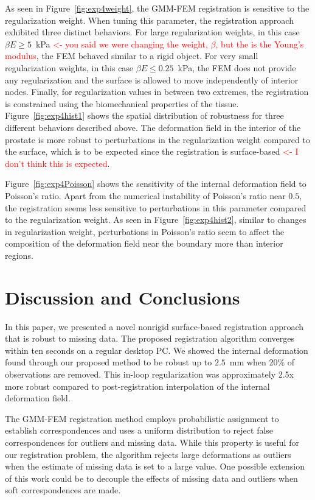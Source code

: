 \documentclass[journal]{IEEEtran}
\newcommand{\comment}[1]{\textcolor{red}{#1}}
\begin{document}
As seen in Figure~\ref{fig:exp4weight}, the GMM-FEM registration is sensitive to the regularization weight. When tuning this parameter, the registration approach exhibited three distinct behaviors. For large regularization weights, in this case $\beta{E}\geq5$~kPa \comment{<- you said we were changing the weight, $\beta$, but the is the Young's modulus}, the FEM behaved similar to a rigid object. For very small regularization weights, in this case $\beta{E}\leq0.25$~kPa, the FEM does not provide any regularization and the surface is allowed to move independently of interior nodes. Finally, for regularization values in between two extremes, the registration is constrained using the biomechanical properties of the tissue. Figure~\ref{fig:exp4hist1} shows the spatial distribution of robustness for three different behaviors described above. The deformation field in the interior of the prostate is more robust to perturbations in the regularization weight compared to the surface, which is to be expected since the registration is surface-based \comment{<- I don't think this is expected}.

Figure~\ref{fig:exp4Poisson} shows the sensitivity of the internal deformation field to Poisson's ratio. Apart from the numerical instability of Poisson's ratio near $0.5$, the registration seems less sensitive to perturbations in this parameter compared to the regularization weight. As seen in Figure~\ref{fig:exp4hist2}, similar to changes in regularization weight, perturbations in Poisson's ratio seem to affect the composition of the deformation field near the boundary more than interior regions.
\section{Discussion and Conclusions}\label{sec:disc}
In this paper, we presented a novel nonrigid surface-based registration approach that is robust to missing data. The proposed registration algorithm converges within ten seconds on a regular desktop PC. We showed the internal deformation found through our proposed method to be robust up to $2.5$~mm when 20\% of observations are removed. This in-loop regularization was approximately 2.5x more robust compared to post-registration interpolation of the internal deformation field.

The GMM-FEM registration method employs probabilistic assignment to establish correspondences and uses a uniform distribution to reject false correspondences for outliers and missing data. While this property is useful for our registration problem, the algorithm rejects large deformations as outliers when the estimate of missing data is set to a large value. One possible extension of this work could be to decouple the effects of missing data and outliers when soft correspondences are made.
\end{document}

